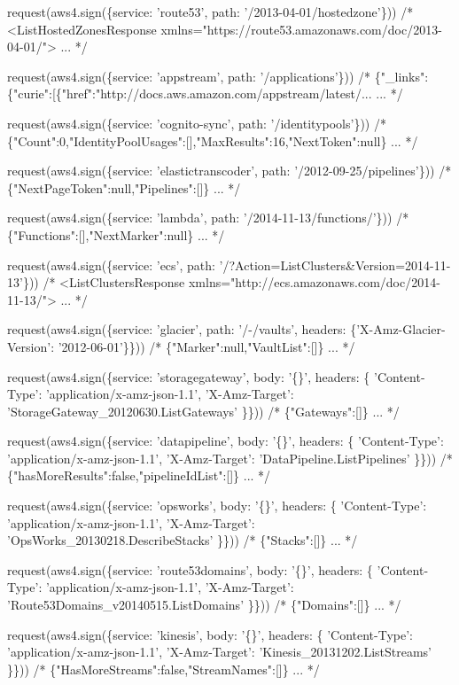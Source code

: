 \begin{DoxyCode}
request(aws4.sign(\{service: 'route53', path: '/2013-04-01/hostedzone'\}))
/*
<ListHostedZonesResponse xmlns="https://route53.amazonaws.com/doc/2013-04-01/">
...
*/

request(aws4.sign(\{service: 'appstream', path: '/applications'\}))
/*
\{"\_links":\{"curie":[\{"href":"http://docs.aws.amazon.com/appstream/latest/...
...
*/

request(aws4.sign(\{service: 'cognito-sync', path: '/identitypools'\}))
/*
\{"Count":0,"IdentityPoolUsages":[],"MaxResults":16,"NextToken":null\}
...
*/

request(aws4.sign(\{service: 'elastictranscoder', path: '/2012-09-25/pipelines'\}))
/*
\{"NextPageToken":null,"Pipelines":[]\}
...
*/

request(aws4.sign(\{service: 'lambda', path: '/2014-11-13/functions/'\}))
/*
\{"Functions":[],"NextMarker":null\}
...
*/

request(aws4.sign(\{service: 'ecs', path: '/?Action=ListClusters&Version=2014-11-13'\}))
/*
<ListClustersResponse xmlns="http://ecs.amazonaws.com/doc/2014-11-13/">
...
*/

request(aws4.sign(\{service: 'glacier', path: '/-/vaults', headers: \{'X-Amz-Glacier-Version':
       '2012-06-01'\}\}))
/*
\{"Marker":null,"VaultList":[]\}
...
*/

request(aws4.sign(\{service: 'storagegateway', body: '\{\}', headers: \{
  'Content-Type': 'application/x-amz-json-1.1',
  'X-Amz-Target': 'StorageGateway\_20120630.ListGateways'
\}\}))
/*
\{"Gateways":[]\}
...
*/

request(aws4.sign(\{service: 'datapipeline', body: '\{\}', headers: \{
  'Content-Type': 'application/x-amz-json-1.1',
  'X-Amz-Target': 'DataPipeline.ListPipelines'
\}\}))
/*
\{"hasMoreResults":false,"pipelineIdList":[]\}
...
*/

request(aws4.sign(\{service: 'opsworks', body: '\{\}', headers: \{
  'Content-Type': 'application/x-amz-json-1.1',
  'X-Amz-Target': 'OpsWorks\_20130218.DescribeStacks'
\}\}))
/*
\{"Stacks":[]\}
...
*/

request(aws4.sign(\{service: 'route53domains', body: '\{\}', headers: \{
  'Content-Type': 'application/x-amz-json-1.1',
  'X-Amz-Target': 'Route53Domains\_v20140515.ListDomains'
\}\}))
/*
\{"Domains":[]\}
...
*/

request(aws4.sign(\{service: 'kinesis', body: '\{\}', headers: \{
  'Content-Type': 'application/x-amz-json-1.1',
  'X-Amz-Target': 'Kinesis\_20131202.ListStreams'
\}\}))
/*
\{"HasMoreStreams":false,"StreamNames":[]\}
...
*/


\end{DoxyCode}
